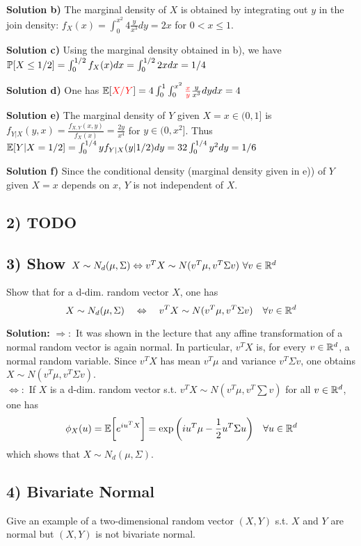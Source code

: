 \textbf{Solution b)} The marginal density of $X$ is obtained by integrating out $y$ in the join density: $f_X(x) = \int_0^{x^2} 4 \frac{y}{x^3}dy = 2x$ for $0 < x \leq 1$.

\textbf{Solution c)} Using the marginal density obtained in b), we have $\mathbb{P}[X \leq 1/2] = \int_0^{1/2}f_X(x) dx = \int_0^{1/2} 2x dx = 1/4$

\textbf{Solution d)} One has
$\mathbb{E}[\textcolor{red}{X/Y}] = 4\int_0^1\int_0^{x^2}\textcolor{red}{\frac{x}{y}}\frac{y}{x^3}dydx = 4$

\textbf{Solution e)} The marginal density of $Y$ given $X = x\in(0,1]$ is
$f_{Y|X}(y,x) = \frac{f_{X,Y}(x,y)}{f_X(x)} = \frac{2y}{x^4}$ for $y \in (0,x^2]$. Thus
$\mathbb{E}[Y | X = 1/2] = \int_0^{1/4} y f_{Y|X}(y|1/2)dy = 32\int_0^{1/4}y^2dy = 1/6$

\textbf{Solution f)} Since the conditional density (marginal density given in e)) of $Y$ given $X=x$ depends on $x$, $Y$ is not independent of $X$.

%
%
\subsection*{2) TODO}

%
%
\subsection*{3) Show $X \sim N_d(\mu,\Sigma) \Leftrightarrow v^TX\sim N(v^T\mu,v^T\Sigma v) \ \forall v \in\mathbb{R}^d$}
Show that for a d-dim. random vector $X$, one has
\[
    X \sim N_d(\mu,\Sigma) \quad \Leftrightarrow \quad v^TX\sim N(v^T\mu,v^T\Sigma v) \quad \forall v \in\mathbb{R}^d
\]

\textbf{Solution:} $\Rightarrow:$ It was shown in the lecture that any affine transformation of a normal random vector is again normal. In particular, $v^TX$ is, for every $v\in\mathbb{R}^d$, a normal random variable. Since $v^TX$ has mean $v^T\mu$ and variance $v^T\Sigma v$, one obtains $X\sim N(v^T\mu, v^T\Sigma v)$.\\
$\Leftrightarrow:$ If $X$ is a d-dim. random vector s.t. $v^TX \sim N(v^T\mu, v^T\sum v)$ for all $v\in \mathbb{R}^d$, one has
\[
    \phi_X(u) = \mathbb{E}\bigg[e^{iu^TX}\bigg] = \exp\bigg(iu^T\mu -\frac{1}{2} u^T\Sigma u\bigg) \quad \forall u\in\mathbb{R}^d
\]
which shows that $X\sim N_d(\mu,\Sigma)$.

%
%
\subsection*{4) Bivariate Normal}
Give an example of a two-dimensional random vector $(X,Y)$ s.t. $X$ and $Y$ are normal but $(X,Y)$ is not bivariate normal.


